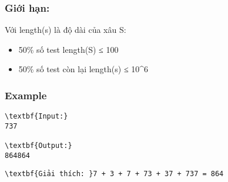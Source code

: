 \subsubsection{Giới hạn:}

Với length(s) là độ dài của xâu S:
\begin{itemize}
	\item 50\% số test length(S) ≤ 100
	\item 50\% số test còn lại length(s) ≤ 10\textasciicircum6
\end{itemize}

\subsubsection{Example}
\begin{verbatim}
\textbf{Input:}
737

\textbf{Output:}
864864
\end{verbatim}
\begin{verbatim}
\textbf{Giải thích: }7 + 3 + 7 + 73 + 37 + 737 = 864
\end{verbatim}
